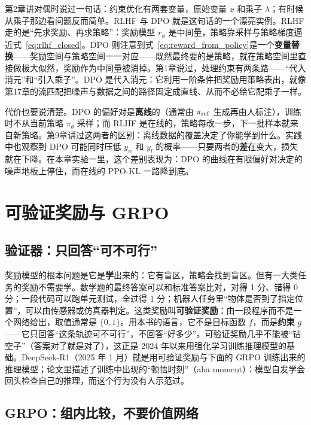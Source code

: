第2章讲对偶时说过一句话：约束优化有两套变量，原始变量 $x$ 和乘子 $\lambda$；有时候从乘子那边看问题反而简单。RLHF 与 DPO 就是这句话的一个漂亮实例。RLHF 走的是“先求奖励、再求策略”：奖励模型 $r_\phi$ 是中间量，策略靠采样与策略梯度逼近式~\eqref{eq:rlhf_closed}。DPO 则注意到式~\eqref{eq:reward_from_policy}是一个\textbf{变量替换}——奖励空间与策略空间一一对应——既然最终要的是策略，就在策略空间里直接做极大似然，奖励作为中间量被消掉。第1章说过，处理约束有两条路——“代入消元”和“引入乘子”。DPO 是代入消元：它利用一阶条件把奖励用策略表出，就像第17章的流匹配把噪声与数据之间的路径固定成直线、从而不必给它配乘子一样。

代价也要说清楚。DPO 的偏好对是\textbf{离线}的（通常由 $\pi_{\rm ref}$ 生成再由人标注），训练时不从当前策略 $\pi_\theta$ 采样；而 RLHF 是在线的，策略每改一步，下一批样本就来自新策略。第9章讲过这两者的区别：离线数据的覆盖决定了你能学到什么。实践中也观察到 DPO 可能同时压低 $y_w$ 和 $y_l$ 的概率——只要两者的\textbf{差}在变大，损失就在下降。在本章实验一里，这个差别表现为：DPO 的曲线在有限偏好对决定的噪声地板上停住，而在线的 PPO-KL 一路降到底。

\section{可验证奖励与 GRPO}

\subsection{验证器：只回答“可不可行”}

奖励模型的根本问题是它是\textbf{学}出来的：它有盲区，策略会找到盲区。但有一大类任务的奖励不需要学。数学题的最终答案可以和标准答案比对，对得 1 分、错得 0 分；一段代码可以跑单元测试，全过得 1 分；机器人任务里“物体是否到了指定位置”，可以由传感器或仿真器判定。这类奖励叫\textbf{可验证奖励}：由一段程序而不是一个网络给出，取值通常是 $\{0, 1\}$。用本书的语言，它不是目标函数 $f$，而是\textbf{约束} $g$——它只回答“这条轨迹可不可行”，不回答“好多少”。可验证奖励几乎不能被“钻空子”（答案对了就是对了），这正是 2024 年以来用强化学习训练推理模型的基础。DeepSeek-R1（2025 年 1 月）就是用可验证奖励与下面的 GRPO 训练出来的推理模型；论文里描述了训练中出现的“顿悟时刻”（aha moment）：模型自发学会回头检查自己的推理，而这个行为没有人示范过。

\subsection{GRPO：组内比较，不要价值网络}

